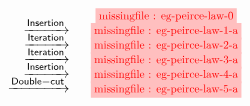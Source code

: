 \setlength{\fboxsep}{2pt}
\setlength{\arraycolsep}{0pt}
\newcommand{\vsp}{\vspace{-0.5em}}
\newcommand{\stkf}{\tikzfig{0.8}{0.45}}
$$
\begin{array}{r@{\quad}c@{\vsp}}
                                  &\stkf{eg-peirce-law-0} \\
       \xstep{\mathsf{Insertion}}       &\stkf{eg-peirce-law-1-a} \\
       \xstep{\mathsf{Iteration}}      &\stkf{eg-peirce-law-2-a} \\
       \xstep{\mathsf{Iteration}}      &\stkf{eg-peirce-law-3-a} \\
       \xstep{\mathsf{Insertion}}       &\stkf{eg-peirce-law-4-a} \\
       \xstep{\mathsf{Double{-}cut}} &\stkf{eg-peirce-law-5-a} \\
\end{array}
$$

